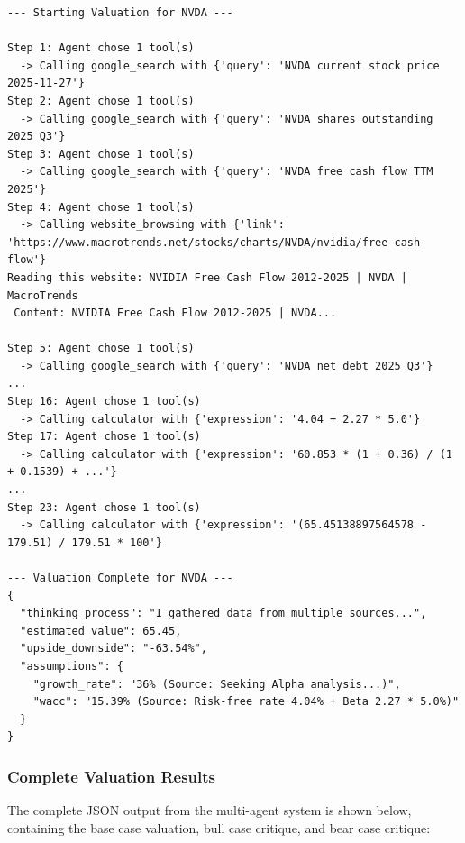 \documentclass{article}
\begin{document}
\begin{lstlisting}[caption={Lead Analyst Process Log (process.log)}, label={lst:process_log}, basicstyle=\ttfamily\tiny]
--- Starting Valuation for NVDA ---

Step 1: Agent chose 1 tool(s)
  -> Calling google_search with {'query': 'NVDA current stock price 2025-11-27'}
Step 2: Agent chose 1 tool(s)
  -> Calling google_search with {'query': 'NVDA shares outstanding 2025 Q3'}
Step 3: Agent chose 1 tool(s)
  -> Calling google_search with {'query': 'NVDA free cash flow TTM 2025'}
Step 4: Agent chose 1 tool(s)
  -> Calling website_browsing with {'link': 'https://www.macrotrends.net/stocks/charts/NVDA/nvidia/free-cash-flow'}
Reading this website: NVIDIA Free Cash Flow 2012-2025 | NVDA | MacroTrends
 Content: NVIDIA Free Cash Flow 2012-2025 | NVDA...

Step 5: Agent chose 1 tool(s)
  -> Calling google_search with {'query': 'NVDA net debt 2025 Q3'}
...
Step 16: Agent chose 1 tool(s)
  -> Calling calculator with {'expression': '4.04 + 2.27 * 5.0'}
Step 17: Agent chose 1 tool(s)
  -> Calling calculator with {'expression': '60.853 * (1 + 0.36) / (1 + 0.1539) + ...'}
...
Step 23: Agent chose 1 tool(s)
  -> Calling calculator with {'expression': '(65.45138897564578 - 179.51) / 179.51 * 100'}

--- Valuation Complete for NVDA ---
{
  "thinking_process": "I gathered data from multiple sources...",
  "estimated_value": 65.45,
  "upside_downside": "-63.54%",
  "assumptions": {
    "growth_rate": "36% (Source: Seeking Alpha analysis...)",
    "wacc": "15.39% (Source: Risk-free rate 4.04% + Beta 2.27 * 5.0%)"
  }
}
\end{lstlisting}

\subsubsection{Complete Valuation Results}
The complete JSON output from the multi-agent system is shown below, containing the base case valuation, bull case critique, and bear case critique:
\end{document}
